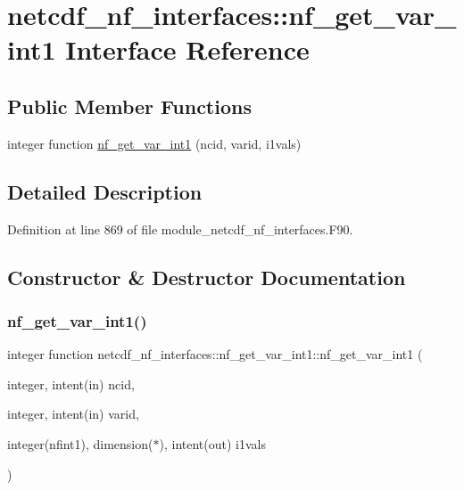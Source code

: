 \hypertarget{interfacenetcdf__nf__interfaces_1_1nf__get__var__int1}{}\section{netcdf\+\_\+nf\+\_\+interfaces\+:\+:nf\+\_\+get\+\_\+var\+\_\+int1 Interface Reference}
\label{interfacenetcdf__nf__interfaces_1_1nf__get__var__int1}
\subsection*{Public Member Functions}
\begin{DoxyCompactItemize}
\item 
integer function \hyperlink{interfacenetcdf__nf__interfaces_1_1nf__get__var__int1_a1e716884fdd309c182f73eb558571121}{nf\+\_\+get\+\_\+var\+\_\+int1} (ncid, varid, i1vals)
\end{DoxyCompactItemize}


\subsection{Detailed Description}


Definition at line 869 of file module\+\_\+netcdf\+\_\+nf\+\_\+interfaces.\+F90.



\subsection{Constructor \& Destructor Documentation}
\mbox{\label{interfacenetcdf__nf__interfaces_1_1nf__get__var__int1_a1e716884fdd309c182f73eb558571121}} 
\subsubsection{\texorpdfstring{nf\+\_\+get\+\_\+var\+\_\+int1()}{nf\_get\_var\_int1()}}
{\footnotesize\ttfamily integer function netcdf\+\_\+nf\+\_\+interfaces\+::nf\+\_\+get\+\_\+var\+\_\+int1\+::nf\+\_\+get\+\_\+var\+\_\+int1 (\begin{DoxyParamCaption}\item[{integer, intent(in)}]{ncid,  }\item[{integer, intent(in)}]{varid,  }\item[{integer(nfint1), dimension($\ast$), intent(out)}]{i1vals }\end{DoxyParamCaption})}



